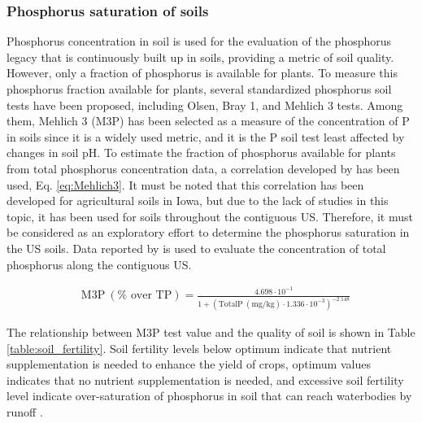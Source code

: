 \begin{refsection}[referencesCh4]
\subsubsection{Phosphorus saturation of soils}
Phosphorus concentration in soil is used for the evaluation of the phosphorus legacy that is continuously built up in soils, providing a metric of soil quality. However, only a fraction of phosphorus is available for plants. To measure this phosphorus fraction available for plants, several standardized phosphorus soil tests have been proposed, including Olsen, Bray 1, and Mehlich 3 tests. Among them,  Mehlich 3 (M3P) has been selected as a measure of the concentration of P in soils since it is a widely used metric, and it is the P soil test least affected by changes in soil pH. To estimate the fraction of phosphorus available for plants from total phosphorus concentration data, a correlation developed by \citet{AllenMallarino2006} has been used, Eq. \ref{eq:Mehlich3}. It must be noted that this correlation has been developed for agricultural soils in Iowa, but due to the lack of studies in this topic, it has been used for soils throughout the contiguous US. Therefore, it must be considered as an exploratory effort to determine the phosphorus saturation in the US soils. Data reported by \citet{SoilsUSGS} is used to evaluate the concentration of total phosphorus along the contiguous US.

\begin{align}
& \text{M3P} \ (\% \text{ over TP}) = \frac{4.698 \cdot 10^{-1}}{1+\left(\text{TotalP} \ (\text{mg}/\text{kg}) \cdot 1.336 \cdot 10^{-3}\right)^{-2.148}} \label{eq:Mehlich3}
\end{align}

The relationship between M3P test value and the quality of soil is shown in Table \ref{table:soil_fertility}. Soil fertility levels below optimum indicate that nutrient supplementation is needed to enhance the yield of crops, optimum values indicates that no nutrient supplementation is needed, and excessive soil fertility level indicate over-saturation of phosphorus in soil that can reach waterbodies by runoff \citep{Espinoza2006}.


\end{refsection}
